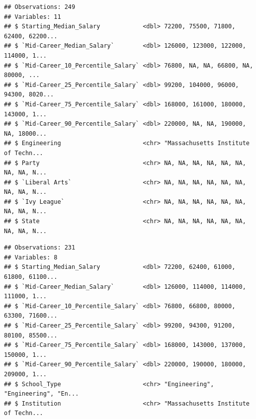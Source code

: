 \documentclass[]{article}
\newenvironment{Shaded}{\begin{snugshade}}{\end{snugshade}}
\newcommand{\KeywordTok}[1]{\textcolor[rgb]{0.13,0.29,0.53}{\textbf{#1}}}
\newcommand{\DataTypeTok}[1]{\textcolor[rgb]{0.13,0.29,0.53}{#1}}
\newcommand{\DecValTok}[1]{\textcolor[rgb]{0.00,0.00,0.81}{#1}}
\newcommand{\StringTok}[1]{\textcolor[rgb]{0.31,0.60,0.02}{#1}}
\newcommand{\OperatorTok}[1]{\textcolor[rgb]{0.81,0.36,0.00}{\textbf{#1}}}
\newcommand{\NormalTok}[1]{#1}
\begin{document}
\begin{verbatim}
## Observations: 249
## Variables: 11
## $ Starting_Median_Salary            <dbl> 72200, 75500, 71800, 62400, 62200...
## $ `Mid-Career_Median_Salary`        <dbl> 126000, 123000, 122000, 114000, 1...
## $ `Mid-Career_10_Percentile_Salary` <dbl> 76800, NA, NA, 66800, NA, 80000, ...
## $ `Mid-Career_25_Percentile_Salary` <dbl> 99200, 104000, 96000, 94300, 8020...
## $ `Mid-Career_75_Percentile_Salary` <dbl> 168000, 161000, 180000, 143000, 1...
## $ `Mid-Career_90_Percentile_Salary` <dbl> 220000, NA, NA, 190000, NA, 18000...
## $ Engineering                       <chr> "Massachusetts Institute of Techn...
## $ Party                             <chr> NA, NA, NA, NA, NA, NA, NA, NA, N...
## $ `Liberal Arts`                    <chr> NA, NA, NA, NA, NA, NA, NA, NA, N...
## $ `Ivy League`                      <chr> NA, NA, NA, NA, NA, NA, NA, NA, N...
## $ State                             <chr> NA, NA, NA, NA, NA, NA, NA, NA, N...
\end{verbatim}

\begin{Shaded}
\end{Shaded}

\begin{verbatim}
## Observations: 231
## Variables: 8
## $ Starting_Median_Salary            <dbl> 72200, 62400, 61000, 61800, 61100...
## $ `Mid-Career_Median_Salary`        <dbl> 126000, 114000, 114000, 111000, 1...
## $ `Mid-Career_10_Percentile_Salary` <dbl> 76800, 66800, 80000, 63300, 71600...
## $ `Mid-Career_25_Percentile_Salary` <dbl> 99200, 94300, 91200, 80100, 85500...
## $ `Mid-Career_75_Percentile_Salary` <dbl> 168000, 143000, 137000, 150000, 1...
## $ `Mid-Career_90_Percentile_Salary` <dbl> 220000, 190000, 180000, 209000, 1...
## $ School_Type                       <chr> "Engineering", "Engineering", "En...
## $ Institution                       <chr> "Massachusetts Institute of Techn...
\end{verbatim}
\end{document}
